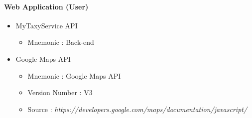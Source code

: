 \documentclass[12pt, a4paper]{article}
\begin{document}
\paragraph{Web Application (User)} 

\begin{itemize}
	\item MyTaxyService API
	\begin{itemize}
		\item Mnemonic : Back-end
	\end{itemize}
	\item Google Maps API
	\begin{itemize}
		\item Mnemonic : Google Maps API
		\item Version Number : V3
		\item Source : \emph{https://developers.google.com/maps/documentation/javascript/} 
	\end{itemize}

\end{itemize}
\end{document}
